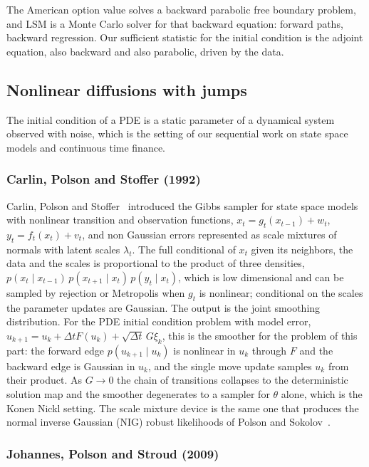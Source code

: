 The American option value solves a backward parabolic free boundary problem, and LSM is a Monte Carlo solver for that backward equation: forward paths, backward regression. Our sufficient statistic for the initial condition is the adjoint equation, also backward and also parabolic, driven by the data.

\subsection{Nonlinear diffusions with jumps}\label{m:sec:jps}

The initial condition of a PDE is a static parameter of a dynamical system observed with noise, which is the setting of our sequential work on state space models and continuous time finance.

\subsubsection{Carlin, Polson and Stoffer (1992)}

Carlin, Polson and Stoffer~\cite{cps1992} introduced the Gibbs sampler for state space models with nonlinear transition and observation functions, $x_t=g_t(x_{t-1})+w_t$, $y_t=f_t(x_t)+v_t$, and non Gaussian errors represented as scale mixtures of normals with latent scales $\lambda_t$. The full conditional of $x_t$ given its neighbors, the data and the scales is proportional to the product of three densities, $p(x_t\mid x_{t-1})\,p(x_{t+1}\mid x_t)\,p(y_t\mid x_t)$, which is low dimensional and can be sampled by rejection or Metropolis when $g_t$ is nonlinear; conditional on the scales the parameter updates are Gaussian. The output is the joint smoothing distribution. For the PDE initial condition problem with model error, $u_{k+1}=u_k+\Delta tF(u_k)+\sqrt{\Delta t}\,G\xi_k$, this is the smoother for the problem of this part: the forward edge $p(u_{k+1}\mid u_k)$ is nonlinear in $u_k$ through $F$ and the backward edge is Gaussian in $u_k$, and the single move update samples $u_k$ from their product. As $G\to0$ the chain of transitions collapses to the deterministic solution map and the smoother degenerates to a sampler for $\theta$ alone, which is the Konen Nickl setting. The scale mixture device is the same one that produces the normal inverse Gaussian (NIG) robust likelihoods of Polson and Sokolov~\cite{polsonsokolov2026ns}.

\subsubsection{Johannes, Polson and Stroud (2009)}


